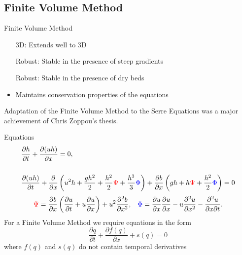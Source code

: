 \documentclass[pdf]{beamer}
\begin{document}
\subsection{Finite Volume Method}
\begin{frame}{Finite Volume Method}
\begin{itemize}
	\item[3D:] Extends well to 3D
	\item[Robust:] Stable in the presence of steep gradients
	\item[Robust:] Stable in the presence of dry beds
	\item Maintains conservation properties of the equations
\end{itemize}
\pause Adaptation of the Finite Volume Method to the Serre Equations was a major achievement of Chris Zoppou's thesis.
\end{frame}

\begin{frame}{Equations}
		\begin{subequations}
			\begin{align*}
			&\frac{\partial h}{\partial t} + \dfrac{\partial (uh)}{\partial x} = 0,  \\ \\
			&\dfrac{\partial (uh)}{\partial t} + \dfrac{\partial}{\partial x} \left ( u^2h + \dfrac{gh^2}{2} + \dfrac{h^2}{2}{ \color{red}\Psi } + \dfrac{h^3}{3}{ { \color{blue} \Phi } }  \right )  +  \dfrac{\partial b}{\partial x} \left (gh +   h { \color{red}\Psi } + \dfrac{h^2}{2}{ { \color{blue} \Phi } }  \right ) = 0
			\end{align*}
		\end{subequations}
				\begin{align*}
				&{ \color{red}\Psi }  = \dfrac{\partial b}{\partial x}\left(\dfrac{\partial u}{\partial t} + u\dfrac{\partial u}{\partial x} \right)  + u^2\dfrac{\partial^2 b}{\partial x^2}, &
				{ \color{blue} \Phi }  = \dfrac{\partial u }{\partial x} \dfrac{\partial u}{\partial x} -u \dfrac{\partial^2 u}{\partial x^2}  - \dfrac{\partial^2 u}{\partial x \partial t} .
				\end{align*}
	For a Finite Volume Method we require equations in the form
	\begin{equation*}
	\frac{\partial q}{\partial t} + \frac{\partial f(q)}{\partial x} + s(q) = 0
	\end{equation*}
	where $f(q)$ and $s(q)$ do not contain temporal derivatives
\end{frame}
\end{document}
